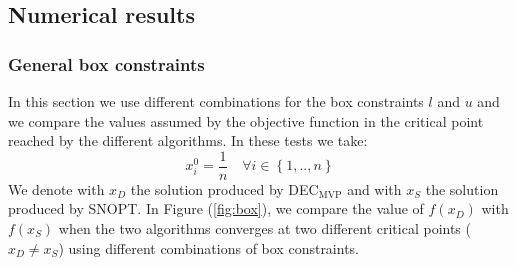 \subsection{Numerical results}
\subsubsection{General box constraints}
In this section we use different combinations for the box constraints $l$ and $u$ and we compare the values assumed by the objective function in the critical point reached by the different algorithms. In these tests we take:
\begin{equation}
x_i^0 = \frac{1}{n} \quad \forall i \in \left\{1, .., n \right\}
\end{equation}
We denote with $x_{D}$ the solution produced by DEC$_{\text{MVP}}$ and with $x_{S}$ the solution produced by SNOPT. In Figure (\ref{fig:box}), we compare the value of $f(x_{D})$ with $f(x_{S})$ when the two algorithms converges at two different critical points ($x_D \neq x_S$) using different combinations of box constraints.

